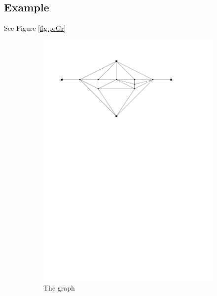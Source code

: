 \documentclass[a4paper]{article}
\theoremstyle{definition}
\begin{document}
\subsection{Example}
See Figure \ref{fig:prGr}
\begin{figure}[h]
    \centering
    \begin{subfigure}[b]{\textwidth}
        \includegraphics[width=\textwidth]{img/problemGraph1}
        \caption{The graph}
    \end{subfigure}
    ~ 
    \begin{subfigure}[b]{\textwidth}

\end{subfigure}
\end{figure}
\end{document}
